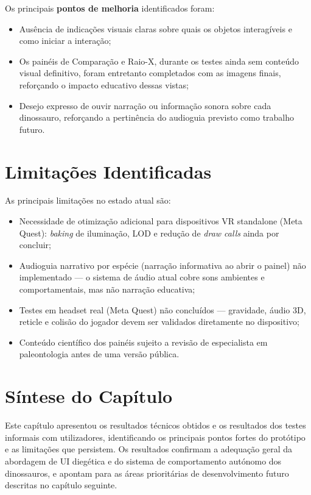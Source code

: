 \documentclass[a4paper,11pt]{report}
\begin{document}
Os principais \textbf{pontos de melhoria} identificados foram:
\begin{itemize}
    \setlength\itemsep{0pt}
    \item Ausência de indicações visuais claras sobre quais os objetos
          interagíveis e como iniciar a interação;
    \item Os painéis de Comparação e Raio-X, durante os testes ainda sem
          conteúdo visual definitivo, foram entretanto completados com as
          imagens finais, reforçando o impacto educativo dessas vistas;
    \item Desejo expresso de ouvir narração ou informação sonora sobre
          cada dinossauro, reforçando a pertinência do audioguia previsto
          como trabalho futuro.
\end{itemize}

\section{Limitações Identificadas}

As principais limitações no estado atual são:

\begin{itemize}
    \setlength\itemsep{0pt}
    \item Necessidade de otimização adicional para dispositivos VR standalone
          (Meta Quest): \textit{baking} de iluminação, LOD e redução de
          \textit{draw calls} ainda por concluir;
    \item Audioguia narrativo por espécie (narração informativa ao abrir o
          painel) não implementado --- o sistema de áudio atual cobre sons
          ambientes e comportamentais, mas não narração educativa;
    \item Testes em headset real (Meta Quest) não concluídos --- gravidade,
          áudio 3D, reticle e colisão do jogador devem ser validados
          diretamente no dispositivo;
    \item Conteúdo científico dos painéis sujeito a revisão de especialista
          em paleontologia antes de uma versão pública.
\end{itemize}

\section{Síntese do Capítulo}

Este capítulo apresentou os resultados técnicos obtidos e os resultados
dos testes informais com utilizadores, identificando os principais pontos
fortes do protótipo e as limitações que persistem. Os resultados confirmam
a adequação geral da abordagem de UI diegética e do sistema de comportamento
autónomo dos dinossauros, e apontam para as áreas prioritárias de
desenvolvimento futuro descritas no capítulo seguinte.
\end{document}
